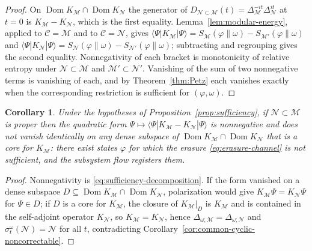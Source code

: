 \documentclass[a4paper,11pt]{article}
\newtheorem{corollary}[theorem]{Corollary}
\theoremstyle{definition}
\newcommand{\mN}{\mathcal{N}}
\newcommand{\mM}{\mathcal{M}}
\begin{document}
\begin{proof}
On $\operatorname{Dom}K_{\mM}\cap\operatorname{Dom}K_{\mN}$ the generator of $D_{\mN\subset\mM}(t)=\Delta_{\mM}^{-it}\Delta_{\mN}^{it}$ at $t=0$ is $K_{\mM}-K_{\mN}$, which is the first equality. Lemma~\ref{lem:modular-energy}, applied to $\mathcal C=\mM$ and to $\mathcal C=\mN$, gives $\langle\Psi|K_{\mM}|\Psi\rangle=S_{\mM}(\varphi\|\omega)-S_{\mM'}(\varphi\|\omega)$ and $\langle\Psi|K_{\mN}|\Psi\rangle=S_{\mN}(\varphi\|\omega)-S_{\mN'}(\varphi\|\omega)$; subtracting and regrouping gives the second equality. Nonnegativity of each bracket is monotonicity of relative entropy under $\mN\subset\mM$ and $\mM'\subset\mN'$. Vanishing of the sum of two nonnegative terms is vanishing of each, and by Theorem~\ref{thm:Petz} each vanishes exactly when the corresponding restriction is sufficient for $(\varphi,\omega)$.
\end{proof}

\begin{corollary}\label{cor:positive-generator}
Under the hypotheses of Proposition~\ref{prop:sufficiency}, if $\mN\subset\mM$ is proper then the quadratic form $\Psi\mapsto\langle\Psi|K_{\mM}-K_{\mN}|\Psi\rangle$ is nonnegative and does not vanish identically on any dense subspace of $\operatorname{Dom}K_{\mM}\cap\operatorname{Dom}K_{\mN}$ that is a core for $K_{\mM}$: there exist states $\varphi$ for which the erasure \eqref{eq:erasure-channel} is not sufficient, and the subsystem flow registers them.
\end{corollary}
\begin{proof}
Nonnegativity is \eqref{eq:sufficiency-decomposition}. If the form vanished on a dense subspace $D\subseteq\operatorname{Dom}K_{\mM}\cap\operatorname{Dom}K_{\mN}$, polarization would give $K_{\mM}\Psi=K_{\mN}\Psi$ for $\Psi\in D$; if $D$ is a core for $K_{\mM}$, the closure of $K_{\mM}|_D$ is $K_{\mM}$ and is contained in the self-adjoint operator $K_{\mN}$, so $K_{\mM}=K_{\mN}$, hence $\Delta_{\omega;\mM}=\Delta_{\omega;\mN}$ and $\sigma^{\omega}_t(\mN)=\mN$ for all $t$, contradicting Corollary~\ref{cor:common-cyclic-noncorrectable}.
\end{proof}
\end{document}
